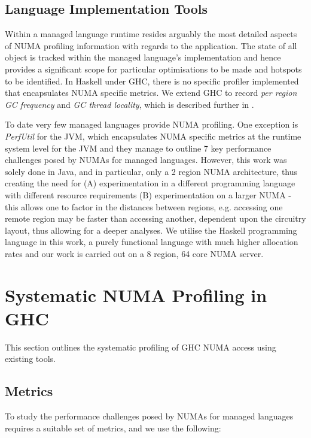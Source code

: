 \documentclass{paper}\usepackage{graphicx}
\begin{document}
\subsection{Language Implementation Tools}
\label{sec:language_tools}

Within a managed language runtime resides arguably the most detailed aspects of NUMA profiling information with regards to the application. The state of all object is tracked within the managed language's implementation and hence provides a significant scope for particular optimisations to be made and hotspots to be identified. In Haskell under GHC, there is no specific profiler implemented that encapsulates NUMA specific metrics. We extend GHC to record \textit{per region GC frequency} and \textit{GC thread locality}, which is described further in .

To date very few managed languages provide NUMA profiling. One exception is \textit{PerfUtil} \cite{DBLP:conf/pppj/PapadakisZFK20} for the JVM, which encapsulates NUMA specific metrics at the runtime system level for the JVM and they manage to outline 7 key performance challenges posed by NUMAs for managed languages. However, this work was solely done in Java, and in particular, only a 2 region NUMA architecture, thus creating the need for (A) experimentation in a different programming language with different resource requirements (B) experimentation on a larger NUMA - this allows one to factor in the distances between regions, e.g. accessing one remote region may be faster than accessing another, dependent upon the circuitry layout, thus allowing for a deeper analyses. We utilise the Haskell programming language in this work, a purely functional language with much higher allocation rates and our work is carried out on a 8 region, 64 core NUMA server.

\section{Systematic NUMA Profiling in \\ GHC}
\label{sec:eval}

This section outlines the systematic profiling of GHC NUMA access using existing tools.

\subsection{Metrics}
\label{sec:metrics}

To study the performance challenges posed by NUMAs for managed languages requires a suitable set of metrics, and we use the following:
\end{document}
